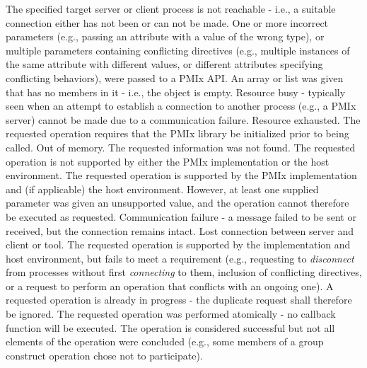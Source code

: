 \begin{constantdesc}
The specified target server or client process is not reachable - i.e., a
suitable connection either has not been or can not be made.
%
One or more incorrect parameters (e.g., passing an attribute with a value of the wrong type), or multiple parameters containing conflicting directives (e.g., multiple instances of the same attribute with different values, or different attributes specifying conflicting behaviors), were passed to a \ac{PMIx} \ac{API}.
%
An array or list was given that has no members in it - i.e., the object is empty.
%
Resource busy - typically seen when an attempt to establish a connection
to another process (e.g., a \ac{PMIx} server) cannot be made due to a
communication failure.
%
Resource exhausted.
%
The requested operation requires that the \ac{PMIx} library be initialized prior to being called.
%
Out of memory.
%
The requested information was not found.
%
The requested operation is not supported by either the \ac{PMIx} implementation
or the host environment.
%
The requested operation is supported by the \ac{PMIx} implementation and (if applicable) the host environment. However, at least one supplied parameter was given an unsupported value, and the operation cannot therefore be executed as requested.
%
Communication failure - a message failed to be sent or received, but the
connection remains intact.
%
Lost connection between server and client or tool.
%
The requested operation is supported by the implementation and host environment, but fails to meet a requirement (e.g., requesting to \textit{disconnect} from processes without first \textit{connecting} to them, inclusion of conflicting directives, or a request to perform an operation that conflicts with an ongoing one).
%
A requested operation is already in progress - the duplicate request
shall therefore be ignored.
%
The requested operation was performed atomically - no callback function will be executed.
%
The operation is considered successful but not all elements of the operation were concluded (e.g., some members of a group construct operation chose not to participate).
%
\end{constantdesc}


